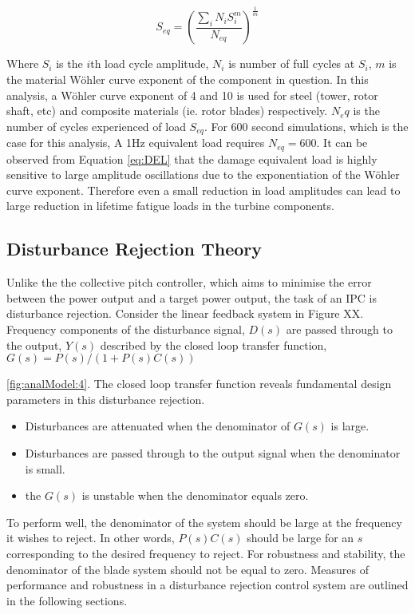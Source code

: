 \begin{equation}\label{eq:DEL}
S_{eq} = \left(\frac{\sum_i N_iS_i^m}{N_{eq}}\right)^{\frac{1}{m}}
\end{equation}

Where $S_i$ is the $i$th load cycle amplitude, $N_i$ is number of full cycles at $S_i$, $m$ is the material W\"{o}hler curve exponent of the component in question. In this analysis, a W\"{o}hler curve exponent of 4 and 10 is used for steel (tower, rotor shaft, etc) and composite materials (ie. rotor blades) respectively. $N_eq$ is the number of cycles experienced of load $S_{eq}$. For 600 second simulations, which is the case for this analysis, A 1Hz equivalent load requires $N_{eq}=600$. It can be observed from Equation \ref{eq:DEL} that the damage equivalent load is highly sensitive to large amplitude oscillations due to the exponentiation of the W\"{o}hler curve exponent. Therefore even a small reduction in load amplitudes can lead to large reduction in lifetime fatigue loads in the turbine components.



\subsection{Disturbance Rejection Theory}

Unlike the the collective pitch controller, which aims to minimise the error between the power output and a target power output, the task of an IPC is disturbance rejection. Consider the linear feedback system in Figure XX. Frequency components of the disturbance signal, $D(s)$ are passed through to the output, $Y(s)$ described by the closed loop transfer function, $G(s) = P(s)/(1+P(s)C(s))$ 

\ref{fig:analModel:4}. The closed loop transfer function reveals fundamental design parameters in this disturbance rejection.
\begin{itemize}
\item Disturbances are attenuated when the denominator of $G(s)$ is large.
\item Disturbances are passed through to the output signal when the denominator is small.
\item the $G(s)$ is unstable when the denominator equals zero.
\end{itemize}
To perform well, the denominator of the system should be large at the frequency it wishes to reject. In other words, $P(s)C(s)$ should be large for an $s$ corresponding to the desired frequency to reject. For robustness and stability, the denominator of the blade system should not be equal to zero. Measures of performance and robustness in a disturbance rejection control system are outlined in the following sections.

